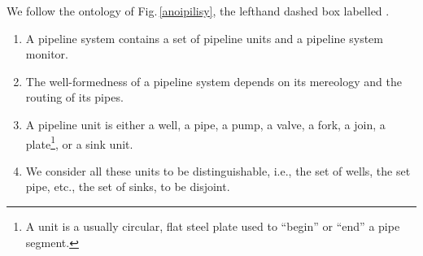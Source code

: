 
\label{pipe-ex1}\HHHH 

We follow the ontology of Fig.\,\ref{anoipilisy}, the lefthand dashed box
labelled .


\mnewfoil

\HHHH


\mnewfoil

\HHHH
\begin{enumerate}\setei
\item \label{p-e-00} A pipeline system contains a set of pipeline 
  units and a pipeline system monitor.
\item \label{p-e--1} The well-formedness of a pipeline system
  depends on its mereology
  and the routing of its pipes. 
\item \label{p-e-01} A pipeline unit is either a well, a pipe, a pump,
  a valve, a fork, a join, a plate\footnote{\LLLL A  unit is a
  usually circular, flat steel plate used to ``begin'' or ``end'' a
  pipe segment.}, or a sink unit.
\item \label{p-e-02} We consider all these units to be
  distinguishable, i.e., the set of wells, the set pipe, etc., the set
  of sinks, to be disjoint.
\savei\end{enumerate} 
\tehrantutorial{\end{multicols}}{}

